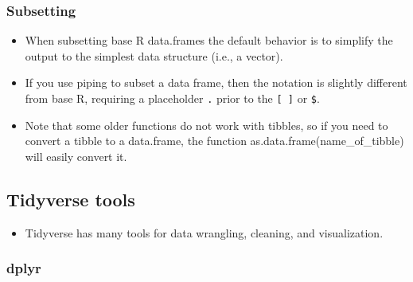 \documentclass[
]{book}
\newenvironment{Shaded}{\begin{snugshade}}{\end{snugshade}}
\newcommand{\CommentTok}[1]{\textcolor[rgb]{0.56,0.35,0.01}{\textit{#1}}}
\newcommand{\NormalTok}[1]{#1}
\newcommand{\SpecialCharTok}[1]{\textcolor[rgb]{0.81,0.36,0.00}{\textbf{#1}}}
\newcommand{\StringTok}[1]{\textcolor[rgb]{0.31,0.60,0.02}{#1}}
\providecommand{\tightlist}{%
  \setlength{\itemsep}{0pt}\setlength{\parskip}{0pt}}
\begin{document}
\subsubsection{Subsetting}\label{subsetting}

\begin{itemize}
\tightlist
\item
  When subsetting base R data.frames the default behavior is to simplify the output to the simplest data structure (i.e., a vector).
\item
  If you use piping to subset a data frame, then the notation is slightly different from base R, requiring a placeholder \texttt{.} prior to the \texttt{{[}\ {]}} or \texttt{\$}.
\end{itemize}

\begin{Shaded}
\end{Shaded}

\begin{itemize}
\tightlist
\item
  Note that some older functions do not work with tibbles, so if you need to convert a tibble to a data.frame, the function as.data.frame(name\_of\_tibble) will easily convert it.
\end{itemize}

\subsection{Tidyverse tools}\label{tidyverse-tools}

\begin{itemize}
\tightlist
\item
  Tidyverse has many tools for data wrangling, cleaning, and visualization.
\end{itemize}

\subsubsection{dplyr}\label{dplyr}
\end{document}
